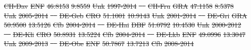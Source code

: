 \documentclass[hess, manuscript]{copernicus}
\providecommand{\DIFdeltex}[1]{{\protect\color{red}\sout{#1}}}                      %
\providecommand{\DIFdel}[1]{\texorpdfstring{\DIFdeltex{#1}}{}} %
\begin{document}
\DIFdel{CH-Dav }%
\DIFdel{ENF }%
\DIFdel{46.8153 }%
\DIFdel{9.8559 }%
\DIFdel{Unk }%
\DIFdel{1997-2014 }%
\DIFdel{\mbox{%
\cite{CH-Dav} }%
}%
\DIFdel{CH-Fru }%
\DIFdel{GRA }%
\DIFdel{47.1158 }%
\DIFdel{8.5378 }%
\DIFdel{Unk }%
\DIFdel{2005-2014 }%
\DIFdel{\mbox{%
\cite{CH-Fru} }%
}%
\DIFdel{DE-Geb }%
\DIFdel{CRO }%
\DIFdel{51.1001 }%
\DIFdel{10.9143 }%
\DIFdel{Unk }%
\DIFdel{2001-2014 }%
\DIFdel{\mbox{%
\cite{DE-Geb} }%
}%
\DIFdel{DE-Gri }%
\DIFdel{GRA }%
\DIFdel{50.9500 }%
\DIFdel{13.5126 }%
\DIFdel{Cfb }%
\DIFdel{2004-2014 }%
\DIFdel{\mbox{%
\cite{DE-Gri} }%
}%
\DIFdel{DE-Hai }%
\DIFdel{DBF }%
\DIFdel{51.0792 }%
\DIFdel{10.4530 }%
\DIFdel{Unk }%
\DIFdel{2000-2012 }%
\DIFdel{\mbox{%
\cite{DE-Hai} }%
}%
\DIFdel{DE-Kli }%
\DIFdel{CRO }%
\DIFdel{50.8931 }%
\DIFdel{13.5224 }%
\DIFdel{Cfb }%
\DIFdel{2004-2014 }%
\DIFdel{\mbox{%
\cite{DE-Gri} }%
}%
\DIFdel{DE-Lkb }%
\DIFdel{ENF }%
\DIFdel{49.0996 }%
\DIFdel{13.3047 }%
\DIFdel{Unk }%
\DIFdel{2009-2013 }%
\DIFdel{\mbox{%
\cite{DE-Lkb} }%
}%
\DIFdel{DE-Obe }%
\DIFdel{ENF }%
\DIFdel{50.7867 }%
\DIFdel{13.7213 }%
\DIFdel{Cfb }%
\DIFdel{2008-2014 }%
\DIFdel{\textendash}%
\end{document}
